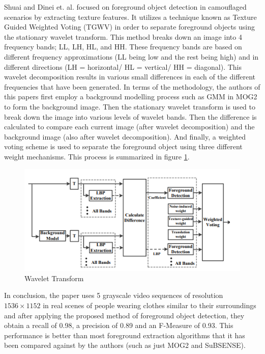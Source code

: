 \documentclass[conference]{IEEEtran}
\begin{document}
Shuai and Dinei et. al. \cite{8297083}  focused on foreground object detection in camouflaged scenarios by extracting texture features. It utilizes a technique known as Texture Guided Weighted Voting (TGWV) in order to separate foreground objects using the stationary wavelet transform. This method breaks down an image into 4 frequency bands; LL, LH, HL, and HH. These frequency bands are based on different frequency approximations (LL being low and the rest being high) and in different directions (LH = horizontal/ HL = vertical/ HH = diagonal). This wavelet decomposition results in various small differences in each of the different frequencies that have been generated. In terms of the methodology, the authors of this papers first employ a background modelling process such as GMM in MOG2 to form the background image. Then the stationary wavelet transform is used to break down the image into various levels of wavelet bands. Then the difference is calculated to compare each current image (after wavelet decomposition) and the background image (also after wavelet decomposition). And finally, a weighted voting scheme is used to separate the foreground object using three different weight mechanisms. This process is summarized in figure \ref{fig1}.
\begin{figure}[h]
    \centering
    \includegraphics[width=0.7\linewidth]{1.png}
    \caption{Wavelet Transform}
    \label{fig1}
\end{figure}
\newpage
In conclusion, the paper uses 5 grayscale video sequences of resolution $ 1536\times 1152 $ in real scenes of people wearing clothes similar to their surroundings and after applying the proposed method of foreground object detection, they obtain a recall of 0.98, a precision of 0.89 and an F-Measure of 0.93. This performance is better than most foreground extraction algorithms that it has been compared against by the authors (such as just MOG2 and SuBSENSE).
\end{document}
